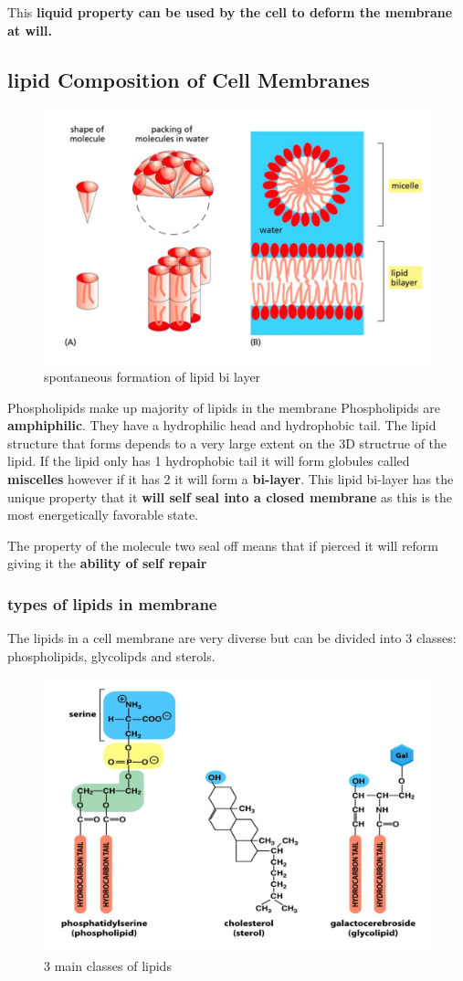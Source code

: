 \documentclass[../main.tex]{subfiles}
\begin{document}
        This \textbf{liquid property can be used by the cell to deform the membrane at will.}

        \subsection{lipid Composition of Cell Membranes}
        \begin{figure}[H]
            \centering
            \includegraphics[width=0.5\linewidth]{biLayer.png}
            \caption{spontaneous formation of lipid bi layer}
            \label{fig:bilayer}
        \end{figure}
        Phospholipids make up majority of lipids in the membrane Phospholipids are \textbf{amphiphilic}. They have a hydrophilic head and hydrophobic tail. The lipid structure that forms depends to a very large extent on the 3D structrue of the lipid. If the lipid only has 1 hydrophobic tail it will form globules called \textbf{miscelles} however if it has 2 it will form a \textbf{bi-layer}. This lipid bi-layer has the unique property that it \textbf{will self seal into a closed membrane} as this is the most energetically favorable state. 

        \begin{remark}
            The property of the molecule two seal off means that if pierced it will reform giving it the \textbf{ability of self repair}
        \end{remark}

        \subsubsection{types of lipids in membrane}
        The lipids in a cell membrane are very diverse but can be divided into 3 classes: phospholipids, glycolipds and sterols.
            \begin{figure}[H]
                \centering
                \includegraphics[width=0.6\linewidth]{Sum_Cell_Bio_II//lectures//cbII1/typesLipids.png}
                \caption{3 main classes of lipids}
                \label{fig:lipids}
            \end{figure}
            
\end{document}
